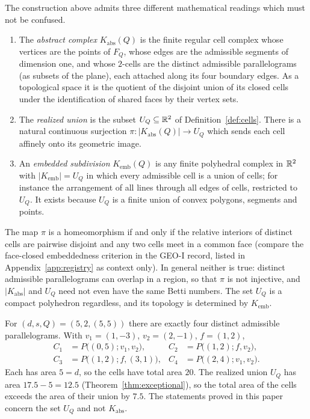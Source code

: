 The construction above admits three different mathematical readings which must not be confused.

\begin{definition}\label{def:kabs}
\begin{enumerate}
\item The \emph{abstract complex} $K_{\mathrm{abs}}(Q)$ is the finite regular cell complex whose vertices are the points of $F_Q$, whose edges are the admissible segments of dimension one, and whose $2$-cells are the distinct admissible parallelograms (as subsets of the plane), each attached along its four boundary edges. As a topological space it is the quotient of the disjoint union of its closed cells under the identification of shared faces by their vertex sets.
\item The \emph{realized union} is the subset $U_Q\subseteq\mathbb R^2$ of Definition~\ref{def:cells}. There is a natural continuous surjection $\pi:|K_{\mathrm{abs}}(Q)|\to U_Q$ which sends each cell affinely onto its geometric image.
\item An \emph{embedded subdivision} $K_{\mathrm{emb}}(Q)$ is any finite polyhedral complex in $\mathbb R^2$ with $|K_{\mathrm{emb}}|=U_Q$ in which every admissible cell is a union of cells; for instance the arrangement of all lines through all edges of cells, restricted to $U_Q$. It exists because $U_Q$ is a finite union of convex polygons, segments and points.
\end{enumerate}
\end{definition}

The map $\pi$ is a homeomorphism if and only if the relative interiors of distinct cells are pairwise disjoint and any two cells meet in a common face (compare the face-closed embeddedness criterion in the GEO-I record, listed in Appendix~\ref{app:registry} as context only). In general neither is true: distinct admissible parallelograms can overlap in a region, so that $\pi$ is not injective, and $|K_{\mathrm{abs}}|$ and $U_Q$ need not even have the same Betti numbers. The set $U_Q$ is a compact polyhedron regardless, and its topology is determined by $K_{\mathrm{emb}}$.

\begin{example}\label{ex:overlap}
For $(d,s,Q)=(5,2,(5,5))$ there are exactly four distinct admissible parallelograms. With $v_1=(1,-3)$, $v_2=(2,-1)$, $f=(1,2)$,
\[
\begin{aligned}
C_1&=P\bigl((0,5);v_1,v_2\bigr), &C_2&=P\bigl((1,2);f,v_2\bigr),\\
C_3&=P\bigl((1,2);f,(3,1)\bigr), &C_4&=P\bigl((2,4);v_1,v_2\bigr).
\end{aligned}
\]
Each has area $5=d$, so the cells have total area $20$. The realized union $U_Q$ has area $17.5-5=12.5$ (Theorem~\ref{thm:exceptional}), so the total area of the cells exceeds the area of their union by $7.5$. The statements proved in this paper concern the set $U_Q$ and not $K_{\mathrm{abs}}$.
\end{example}

